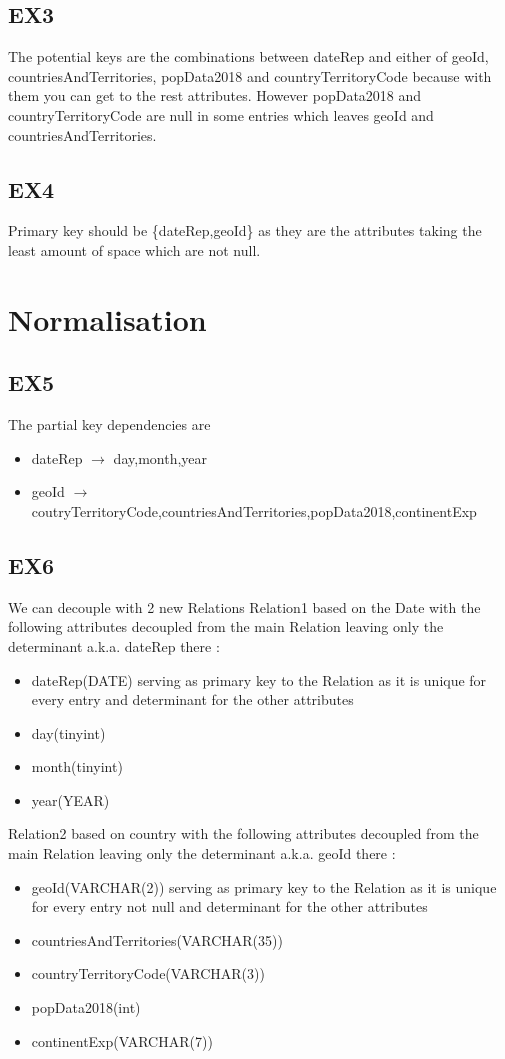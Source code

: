 \documentclass{article}
\begin{document}
\subsection{EX3}
The potential keys are the combinations between dateRep and either of geoId, countriesAndTerritories, popData2018 and countryTerritoryCode because with them you can get to the rest attributes. However popData2018 and countryTerritoryCode are null in some entries which leaves geoId and countriesAndTerritories.
\subsection{EX4}
Primary key should be \{dateRep,geoId\} as they are the attributes taking the least amount of space which are not null.
\section{Normalisation}
\subsection{EX5}
The partial key dependencies are 
\begin{itemize}
	\item dateRep $\rightarrow$ day,month,year
	\item geoId $\rightarrow$ coutryTerritoryCode,countriesAndTerritories,popData2018,continentExp
\end{itemize}
\subsection{EX6}
We can decouple with 2 new Relations
Relation1 based on the Date with the following attributes decoupled from the main Relation leaving only the determinant a.k.a. dateRep there :
\begin{itemize}
	\item dateRep(DATE) serving as primary key to the Relation as it is unique for every entry and determinant for the other attributes
	\item day(tinyint)
	\item month(tinyint)
	\item year(YEAR)
\end{itemize}
Relation2 based on country with the following attributes decoupled from the main Relation leaving only the determinant a.k.a. geoId there :
\begin{itemize}
	\item geoId(VARCHAR(2)) serving as primary key to the Relation as it is unique for every entry not null and determinant for the other attributes
	\item countriesAndTerritories(VARCHAR(35))
	\item countryTerritoryCode(VARCHAR(3))
	\item popData2018(int)
	\item continentExp(VARCHAR(7))
\end{itemize}
\end{document}
